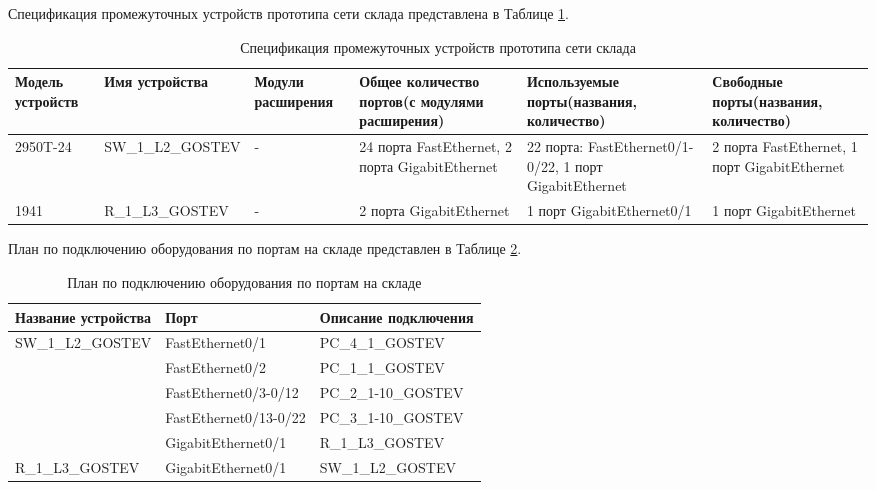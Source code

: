 \documentclass[14pt, a4paper]{extarticle}
\numberwithin{equation}{section}
\begin{document}
Спецификация промежуточных устройств прототипа сети склада представлена в Таблице \ref{table:warehouseDevicesSpecs}.

    
\begin{landscape}
\begin{table}[H]
\centering
\small
\caption{Спецификация промежуточных устройств прототипа сети склада}
\label{table:warehouseDevicesSpecs}
\begin{tabular}{|m{2.5cm}|m{4cm}|m{3cm}|m{4.2cm}|m{5.3cm}|m{4cm}|}
\hline
\textbf{Модель устройств} & \textbf{Имя устройства} & \textbf{Модули расширения} & \textbf{Общее количество портов(с модулями расширения)} & \textbf{Используемые порты(названия, количество)} & \textbf{Свободные порты(названия, количество)} \\
\hline
2950T-24 &
SW\_1\_L2\_GOSTEV &
- &
24 порта FastEthernet, 2 порта GigabitEthernet &
22 порта: FastEthernet0/1-0/22, 1 порт GigabitEthernet &
2 порта FastEthernet, 1 порт GigabitEthernet \\
\hline
1941 &
R\_1\_L3\_GOSTEV &
- &
2 порта GigabitEthernet &
1 порт GigabitEthernet0/1 &
1 порт GigabitEthernet \\
\hline
\end{tabular}
\end{table}
\end{landscape}

План по подключению оборудования по портам на складе представлен в Таблице \ref{table:warehouseConnectionPlan}.
\begin{table}[H]
\small
\centering
\caption{План по подключению оборудования по портам на складе}
\label{table:warehouseConnectionPlan}
\begin{tabular}{|l|l|l|}
\hline
\textbf{Название устройства}       & \textbf{Порт}         & \textbf{Описание подключения} \\ \hline
\multirow{5}{*}{SW\_1\_L2\_GOSTEV} & FastEthernet0/1       & PC\_4\_1\_GOSTEV              \\ \cline{2-3} 
                                   & FastEthernet0/2       & PC\_1\_1\_GOSTEV              \\ \cline{2-3} 
                                   & FastEthernet0/3-0/12  & PC\_2\_1-10\_GOSTEV           \\ \cline{2-3} 
                                   & FastEthernet0/13-0/22 & PC\_3\_1-10\_GOSTEV           \\ \cline{2-3} 
                                   & GigabitEthernet0/1    & R\_1\_L3\_GOSTEV              \\ \hline
R\_1\_L3\_GOSTEV                   & GigabitEthernet0/1    & SW\_1\_L2\_GOSTEV             \\ \hline
\end{tabular}
\end{table}
\end{document}
